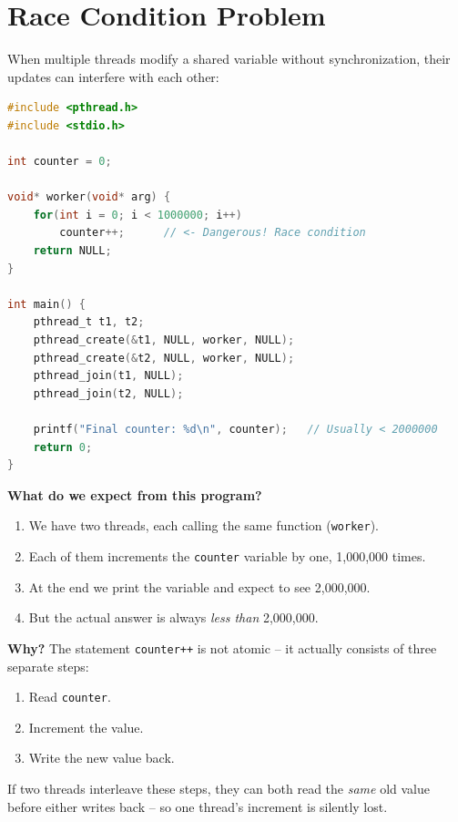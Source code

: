 \section{Race Condition Problem} %
\label{sec:race-condition} %
When multiple threads modify a shared variable without synchronization, their updates can interfere with each other: %
\begin{lstlisting}[language=C]
#include <pthread.h>
#include <stdio.h>

int counter = 0;

void* worker(void* arg) {
    for(int i = 0; i < 1000000; i++)
        counter++;      // <- Dangerous! Race condition
    return NULL;
}

int main() {
    pthread_t t1, t2;
    pthread_create(&t1, NULL, worker, NULL);
    pthread_create(&t2, NULL, worker, NULL);
    pthread_join(t1, NULL);
    pthread_join(t2, NULL);

    printf("Final counter: %d\n", counter);   // Usually < 2000000
    return 0;
}
\end{lstlisting} %

\textbf{What do we expect from this program?} %
\begin{enumerate}
    \item We have two threads, each calling the same function (\texttt{worker}). %
    \item Each of them increments the \texttt{counter} variable by one, 1{,}000{,}000 times. %
    \item At the end we print the variable and expect to see 2{,}000{,}000. %
    \item But the actual answer is always \emph{less than} 2{,}000{,}000. %
\end{enumerate}

\textbf{Why?} The statement \texttt{counter++} is not atomic -- it actually consists of three separate steps: %
\begin{enumerate}
    \item Read \texttt{counter}. %
    \item Increment the value. %
    \item Write the new value back. %
\end{enumerate}
If two threads interleave these steps, they can both read the \emph{same} old value before either writes back -- so one thread's increment is silently lost. %

